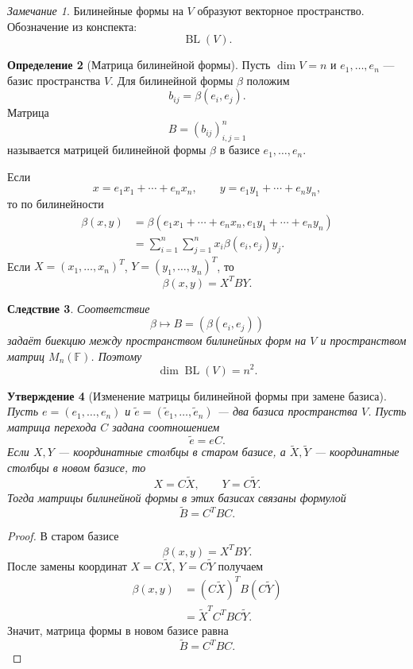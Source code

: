 \documentclass[12pt,a4paper]{article}
\theoremstyle{definition}
\newtheorem{definition}{Определение}[section]
\theoremstyle{plain}
\newtheorem{proposition}[definition]{Утверждение}
\newtheorem{corollary}[definition]{Следствие}
\theoremstyle{remark}
\newtheorem{remark}[definition]{Замечание}
\newcommand{\F}{\mathbb{F}}
\newcommand{\BL}{\operatorname{BL}}
\begin{document}
\begin{remark}
Билинейные формы на $V$ образуют векторное пространство.
Обозначение из конспекта:
\[
    \BL(V).
\]
\end{remark}

\begin{definition}[Матрица билинейной формы]
Пусть $\dim V=n$ и $e_1,\ldots,e_n$ --- базис пространства $V$.
Для билинейной формы $\beta$ положим
\[
    b_{ij}=\beta(e_i,e_j).
\]
Матрица
\[
    B=(b_{ij})_{i,j=1}^n
\]
называется матрицей билинейной формы $\beta$ в базисе $e_1,\ldots,e_n$.
\end{definition}

Если
\[
    x=e_1x_1+\cdots+e_nx_n,\qquad
    y=e_1y_1+\cdots+e_ny_n,
\]
то по билинейности
\[
\begin{aligned}
    \beta(x,y)
    &=\beta(e_1x_1+\cdots+e_nx_n,
             e_1y_1+\cdots+e_ny_n) \\
    &=\sum_{i=1}^n\sum_{j=1}^n x_i\beta(e_i,e_j)y_j.
\end{aligned}
\]
Если $X=(x_1,\ldots,x_n)^T$, $Y=(y_1,\ldots,y_n)^T$, то
\[
    \beta(x,y)=X^TBY.
\]

\begin{corollary}
Соответствие
\[
    \beta \longmapsto B=(\beta(e_i,e_j))
\]
задаёт биекцию между пространством билинейных форм на $V$ и пространством матриц $M_n(\F)$.
Поэтому
\[
    \dim \BL(V)=n^2.
\]
\end{corollary}


\begin{proposition}[Изменение матрицы билинейной формы при замене базиса]
Пусть $e=(e_1,\ldots,e_n)$ и $\widetilde e=(\widetilde e_1,\ldots,\widetilde e_n)$ --- два базиса пространства $V$.
Пусть матрица перехода $C$ задана соотношением
\[
    \widetilde e = eC.
\]
Если $X,Y$ --- координатные столбцы в старом базисе, а $\widetilde X,\widetilde Y$ --- координатные столбцы в новом базисе, то
\[
    X=C\widetilde X,
    \qquad
    Y=C\widetilde Y.
\]
Тогда матрицы билинейной формы в этих базисах связаны формулой
\[
    \widetilde B=C^TBC.
\]
\end{proposition}

\begin{proof}
В старом базисе
\[
    \beta(x,y)=X^TBY.
\]
После замены координат $X=C\widetilde X$, $Y=C\widetilde Y$ получаем
\[
\begin{aligned}
    \beta(x,y)
    &=(C\widetilde X)^T B(C\widetilde Y) \\
    &=\widetilde X^T C^TBC\widetilde Y.
\end{aligned}
\]
Значит, матрица формы в новом базисе равна
\[
    \widetilde B=C^TBC.
\]
\end{proof}
\end{document}
